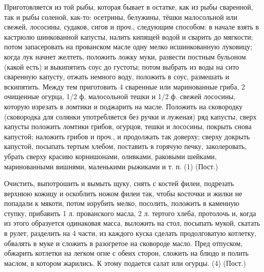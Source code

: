 
Приготовляется из той рыбы, которая бывает в остатке, как из рыбы сваренной, так и рыбы соленой, как-то: осетрины, белужины, тёшки малосольной или свежей, лососины, судаков, сигов и проч., следующим способом: в начале взять в кастрюлю шинкованной капусты, налить кипящей водой и сварить до мягкости; потом запасеровать на прованском масле одну мелко исшинкованную луковицу; когда лук начнет желтеть, положить ложку муки, развести постным бульоном (какой есть) и выкипятить соус до густоты; потом выбрать из воды на сито сваренную капусту, отжать немного воду, положить в соус, размешать и вскипятить. Между тем приготовить 4 сваренные или маринованные гриба, 2 очищенные огурца, 1/2 ф. малосольной тешки и 1/2 ф. свежей лососины, которую изрезать в ломтики и поджарить на масле. Положить на сковородку (сковородка для солянки употребляется без ручки и луженая) ряд капусты, сверх капусты положить ломтики грибов, огурцов, тешки и лососины, покрыть снова капустой; наложить грибов и проч., и продолжать так доверху; сверху докрыть капустой, посыпать тертым хлебом, поставить в горячую печку, заколеровать, убрать сверху красиво корнишонами, оливками, раковыми шейками, маринованными вишнями, маленькими рыжиками и т. п. (1) (Пост.) 


Очистить, выпотрошить и вымыть щуку, снять с костей филеи, подрезать верхнюю кожицу и оскоблить ножом филеи так, чтобы косточки и жилки не попадали к мякоти, потом изрубить мелко, посолить, положить в каменную ступку, прибавить 1 л. прованского масла, 2 л. тертого хлеба, протолочь и, когда из этого образуется одинаковая масса, выложить на стол, посыпать мукой, скатать в рулет, разделить на 4 части, из каждого куска сделать продолговатую котлетку, обвалять в муке и сложить в разогретое на сковороде масло. Пред отпуском, обжарить котлетки на легком огне с обеих сторон, сложить на блюдо и полить маслом, в котором жарились. К этому подается салат или огурцы. (4) (Пост.) 


